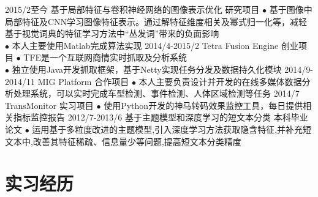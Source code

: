 \documentclass[]{friggeri-cv-cn}
\begin{document}
\begin{entrylist}
  \entry
    {2015/2至今}
    {基于局部特征与卷积神经网络的图像表示优化}
    {研究项目}
    {$\bullet$ 基于图像中局部特征及CNN学习图像特征表示。通过解特征维度相关及幂式归一化等，减轻基于视觉词典的特征学习方法中“丛发词”带来的负面影响 \\
    $\bullet$ 本人主要使用Matlab完成算法实现}
  \entry
    {2014/4-2015/2}
    {Tetra Fusion Engine}
    {创业项目}
    {$\bullet$ TFE是一个互联网商情实时抓取及分析系统\\
    $\bullet$ 独立使用Java开发抓取框架，基于Netty实现任务分发及数据持久化模块}
  \entry
    {2014/9-2014/11}
    {MIG Platform}
    {合作项目}
    {$\bullet$ 本人主要负责设计并开发的在线多媒体数据分析处理系统，可以实时完成车型检测、事件检测、人体区域检测等任务}
  \entry
    {2014/7}
    {TransMonitor}
    {实习项目}
    {$\bullet$ 使用Python开发的神马转码效果监控工具，每日提供相关指标监控报告}
  \entry
    {2012/7-2013/6}
    {基于主题模型和深度学习的短文本分类}
    {本科毕业论文}
    {$\bullet$ 运用基于多粒度改进的主题模型,引入深度学习方法获取隐含特征,并补充短文本中,改善其特征稀疏、信息量少等问题,提高短文本分类精度}
\end{entrylist}



\section{实习经历}
\end{document}
